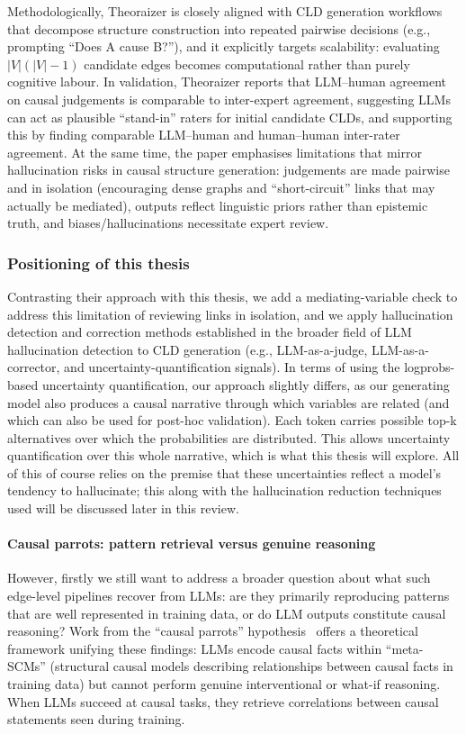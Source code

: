 Methodologically, Theoraizer is closely aligned with CLD generation workflows that decompose structure construction into repeated pairwise decisions (e.g., prompting ``Does A cause B?''), and it explicitly targets scalability: evaluating $|V|(|V|-1)$ candidate edges becomes computational rather than purely cognitive labour. In validation, Theoraizer reports that LLM--human agreement on causal judgements is comparable to inter-expert agreement, suggesting LLMs can act as plausible ``stand-in'' raters for initial candidate CLDs, and supporting this by finding comparable LLM--human and human--human inter-rater agreement. At the same time, the paper emphasises limitations that mirror hallucination risks in causal structure generation: judgements are made pairwise and in isolation (encouraging dense graphs and ``short-circuit'' links that may actually be mediated), outputs reflect linguistic priors rather than epistemic truth, and biases/hallucinations necessitate expert review.

\subsubsection{Positioning of this thesis}

Contrasting their approach with this thesis, we add a mediating-variable check to address this limitation of reviewing links in isolation, and we apply hallucination detection and correction methods established in the broader field of LLM hallucination detection to CLD generation (e.g., LLM-as-a-judge, LLM-as-a-corrector, and uncertainty-quantification signals). In terms of using the logprobs-based uncertainty quantification, our approach slightly differs, as our generating model also produces a causal narrative through which variables are related (and which can also be used for post-hoc validation). Each token carries possible top-k alternatives over which the probabilities are distributed. This allows uncertainty quantification over this whole narrative, which is what this thesis will explore. All of this of course relies on the premise that these uncertainties reflect a model's tendency to hallucinate; this along with the hallucination reduction techniques used will be discussed later in this review.

\paragraph{Causal parrots: pattern retrieval versus genuine reasoning}
However, firstly we still want to address a broader question about what such edge-level pipelines recover from LLMs: are they primarily reproducing patterns that are well represented in training data, or do LLM outputs constitute causal reasoning? Work from the ``causal parrots'' hypothesis~\citep{zecevic2023causalparrots} offers a theoretical framework unifying these findings: LLMs encode causal facts within ``meta-SCMs'' (structural causal models describing relationships between causal facts in training data) but cannot perform genuine interventional or what-if reasoning. When LLMs succeed at causal tasks, they retrieve correlations between causal statements seen during training.

